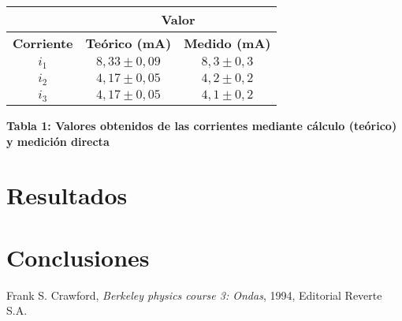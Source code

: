 \documentclass[11pt,a4paper]{article}
\begin{document}
\begin{center}
\begin{tabular}{||c|c|c||}
\hline
 & \multicolumn{2}{c||}{\textbf{Valor}} \\ \hline
\textbf{Corriente} & \textbf{Teórico (mA)} & \textbf{Medido (mA)} \\ \hline 
$i_1$ & $8,33\pm0,09$ & $8,3\pm0,3$ \\ \hline 
$i_2$ & $4,17\pm0,05$ & $4,2\pm0,2$ \\ \hline 
$i_3$ & $4,17\pm0,05$ & $4,1\pm0,2$ \\ \hline 
\end{tabular}

\textbf{Tabla 1: Valores obtenidos de las corrientes mediante cálculo (teórico) y medición directa}
\end{center}


\section{Resultados}
\label{sec:discusion}



\section{Conclusiones}
\label{sec:conclusiones}







\begin{thebibliography}{1}
  Frank S. Crawford, \textit{Berkeley physics course 3: Ondas}, 1994, Editorial Reverte S.A.
\end{thebibliography}
 
\end{document}
